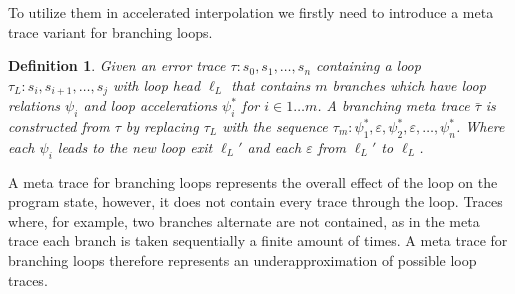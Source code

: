 \documentclass{article}
\newcounter{example}[section]
\newtheorem{mydef}{Definition}
\newcommand\mycom[1]{}
\newcommand\mycom[1]{#1}
\newcommand{\ts}[1]{\mycom{\todo[color=green!40,inline]{\small TS: #1}}}
\begin{document}
To utilize them in accelerated interpolation we firstly need to introduce a meta trace variant for branching loops.

\begin{mydef}
    Given an error trace $\tau: s_0, s_1, \ldots, s_n$ containing a loop $\tau_L: s_i, s_{i+1}, \ldots, s_j$ with loop head $\ell_L$ that contains $m$ branches which have loop relations $\psi_i$ and loop accelerations $\psi_i^*$ for $i \in 1 \ldots m$.\ts{use a different index, $i$ is the loophead index} A branching meta trace $\bar{\tau}$ is constructed from $\tau$ by replacing $\tau_L$ with the sequence $\tau_m: \psi_1^*, \varepsilon, \psi_2^*, \varepsilon, \ldots, \psi_n^* $. Where each $\psi_i$ leads to the new loop exit $\ell_L'$ and each $\varepsilon$ from $\ell_L'$ to $\ell_L$.
\end{mydef}
 A meta trace for branching loops represents the overall effect of the loop on the program state, however, it does not contain every trace through the loop. Traces where, for example, two branches alternate are not contained, as in the meta trace each branch is taken sequentially a finite amount of times. A meta trace for branching loops therefore represents an underapproximation of possible loop traces. \\ \par
\end{document}
